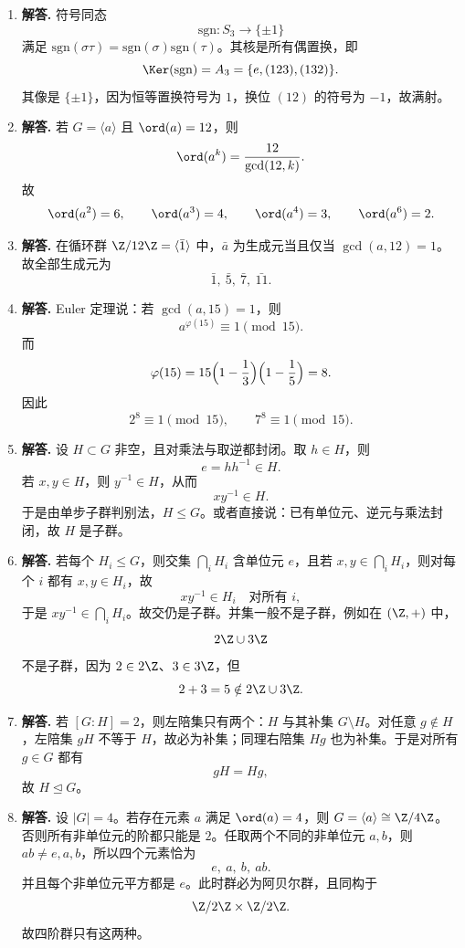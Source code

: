 \begin{enumerate}[label=\textbf{\arabic*.}, leftmargin=*, itemsep=1em]
\item \textbf{解答.} 符号同态
\[
\mathrm{sgn}:S_3\to\{\pm1\}
\]
满足 $\mathrm{sgn}(\sigma\tau)=\mathrm{sgn}(\sigma)\mathrm{sgn}(\tau)$。其核是所有偶置换，即
\[
\Ker(\mathrm{sgn})=A_3=\{e,(123),(132)\}.
\]
其像是 $\{\pm1\}$，因为恒等置换符号为 $1$，换位 $(12)$ 的符号为 $-1$，故满射。

\item \textbf{解答.} 若 $G=\langle a\rangle$ 且 $\ord(a)=12$，则
\[
\ord(a^k)=\frac{12}{\gcd(12,k)}.
\]
故
\[
\ord(a^2)=6,\qquad \ord(a^3)=4,\qquad \ord(a^4)=3,\qquad \ord(a^6)=2.
\]

\item \textbf{解答.} 在循环群 $\Z/12\Z=\langle \bar1\rangle$ 中，$\bar a$ 为生成元当且仅当 $\gcd(a,12)=1$。故全部生成元为
\[
\bar1,\ \bar5,\ \bar7,\ \bar{11}.
\]

\item \textbf{解答.} Euler 定理说：若 $\gcd(a,15)=1$，则
\[
a^{\varphi(15)}\equiv1\pmod{15}.
\]
而
\[
\varphi(15)=15\Bigl(1-\frac13\Bigr)\Bigl(1-\frac15\Bigr)=8.
\]
因此
\[
2^8\equiv1\pmod{15},\qquad 7^8\equiv1\pmod{15}.
\]

\item \textbf{解答.} 设 $H\subset G$ 非空，且对乘法与取逆都封闭。取 $h\in H$，则
\[
e=hh^{-1}\in H.
\]
若 $x,y\in H$，则 $y^{-1}\in H$，从而
\[
xy^{-1}\in H.
\]
于是由单步子群判别法，$H\le G$。或者直接说：已有单位元、逆元与乘法封闭，故 $H$ 是子群。

\item \textbf{解答.} 若每个 $H_i\le G$，则交集 $\bigcap_i H_i$ 含单位元 $e$，且若 $x,y\in \bigcap_i H_i$，则对每个 $i$ 都有 $x,y\in H_i$，故
\[
xy^{-1}\in H_i\quad \text{对所有 }i,
\]
于是 $xy^{-1}\in \bigcap_i H_i$。故交仍是子群。并集一般不是子群，例如在 $(\Z,+)$ 中，
\[
2\Z\cup 3\Z
\]
不是子群，因为 $2\in2\Z$、$3\in3\Z$，但
\[
2+3=5\notin 2\Z\cup3\Z.
\]

\item \textbf{解答.} 若 $[G:H]=2$，则左陪集只有两个：$H$ 与其补集 $G\setminus H$。对任意 $g\notin H$，左陪集 $gH$ 不等于 $H$，故必为补集；同理右陪集 $Hg$ 也为补集。于是对所有 $g\in G$ 都有
\[
gH=Hg,
\]
故 $H\trianglelefteq G$。

\item \textbf{解答.} 设 $|G|=4$。若存在元素 $a$ 满足 $\ord(a)=4$，则 $G=\langle a\rangle\cong \Z/4\Z$。否则所有非单位元的阶都只能是 $2$。任取两个不同的非单位元 $a,b$，则 $ab\neq e,a,b$，所以四个元素恰为
\[
e,\ a,\ b,\ ab.
\]
并且每个非单位元平方都是 $e$。此时群必为阿贝尔群，且同构于
\[
\Z/2\Z\times \Z/2\Z.
\]
故四阶群只有这两种。


\end{enumerate}
